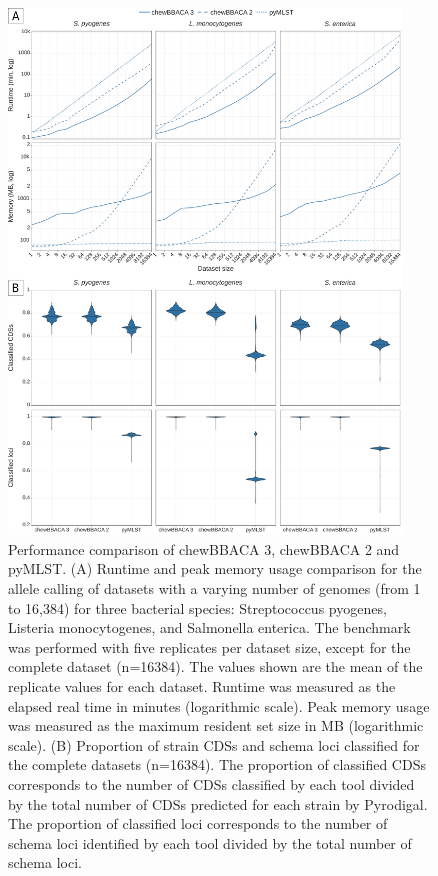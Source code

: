 \begin{figure}[h!]
    \centering
    \includegraphics[angle=0,width=0.93\textwidth]{figures/chapter 2/Figure2.pdf}
    \caption{Performance comparison of chewBBACA 3, chewBBACA 2 and pyMLST. (A) Runtime and peak memory usage comparison for the allele calling of datasets with a varying number of genomes (from 1 to 16,384) for three bacterial species: Streptococcus pyogenes, Listeria monocytogenes, and Salmonella enterica. The benchmark was performed with five replicates per dataset size, except for the complete dataset (n=16384). The values shown are the mean of the replicate values for each dataset. Runtime was measured as the elapsed real time in minutes (logarithmic scale). Peak memory usage was measured as the maximum resident set size in MB (logarithmic scale). (B) Proportion of strain CDSs and schema loci classified for the complete datasets (n=16384). The proportion of classified CDSs corresponds to the number of CDSs classified by each tool divided by the total number of CDSs predicted for each strain by Pyrodigal. The proportion of classified loci corresponds to the number of schema loci identified by each tool divided by the total number of schema loci.}
    \label{fig:chap2_figure2}
\end{figure}

